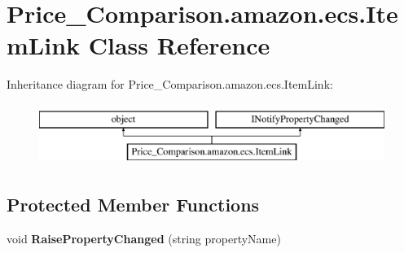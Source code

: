 \hypertarget{class_price___comparison_1_1amazon_1_1ecs_1_1_item_link}{\section{Price\-\_\-\-Comparison.\-amazon.\-ecs.\-Item\-Link Class Reference}
\label{class_price___comparison_1_1amazon_1_1ecs_1_1_item_link}
}


 


Inheritance diagram for Price\-\_\-\-Comparison.\-amazon.\-ecs.\-Item\-Link\-:\begin{figure}[H]
\begin{center}
\leavevmode
\includegraphics[height=2.000000cm]{class_price___comparison_1_1amazon_1_1ecs_1_1_item_link}
\end{center}
\end{figure}
\subsection*{Protected Member Functions}
\begin{DoxyCompactItemize}
\item 
\hypertarget{class_price___comparison_1_1amazon_1_1ecs_1_1_item_link_af2465d4306685e4979eab5ebc5ca7be8}{void {\bfseries Raise\-Property\-Changed} (string property\-Name)}\label{class_price___comparison_1_1amazon_1_1ecs_1_1_item_link_af2465d4306685e4979eab5ebc5ca7be8}

\end{DoxyCompactItemize}
